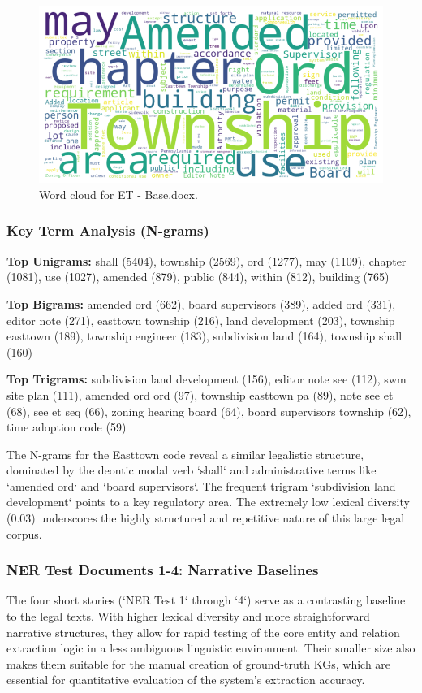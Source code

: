 \begin{figure}[!ht]
  \centering
  \includegraphics[width=\textwidth]{figures/appendix_fig/GRP002EXP006_eda_wordcloud.png}
  \caption{Word cloud for ET - Base.docx.}
  \label{fig:et_wordcloud}
\end{figure}

\subsubsection*{Key Term Analysis (N-grams)}
\textbf{Top Unigrams:} 
shall (5404), township (2569), ord (1277), may (1109), chapter (1081), use (1027), amended (879), public (844), within (812), building (765)
\par
\textbf{Top Bigrams:} 
amended ord (662), board supervisors (389), added ord (331), editor note (271), easttown township (216), land development (203), township easttown (189), township engineer (183), subdivision land (164), township shall (160)
\par
\textbf{Top Trigrams:} 
subdivision land development (156), editor note see (112), swm site plan (111), amended ord ord (97), township easttown pa (89), note see et (68), see et seq (66), zoning hearing board (64), board supervisors township (62), time adoption code (59)
\par
\vspace{1em}
The N-grams for the Easttown code reveal a similar legalistic structure, dominated by the deontic modal verb `shall` and administrative terms like `amended ord` and `board supervisors`. The frequent trigram `subdivision land development` points to a key regulatory area. The extremely low lexical diversity (0.03) underscores the highly structured and repetitive nature of this large legal corpus.

\subsubsection*{NER Test Documents 1-4: Narrative Baselines}
The four short stories (`NER Test 1` through `4`) serve as a contrasting baseline to the legal texts. With higher lexical diversity and more straightforward narrative structures, they allow for rapid testing of the core entity and relation extraction logic in a less ambiguous linguistic environment. Their smaller size also makes them suitable for the manual creation of ground-truth KGs, which are essential for quantitative evaluation of the system's extraction accuracy.

